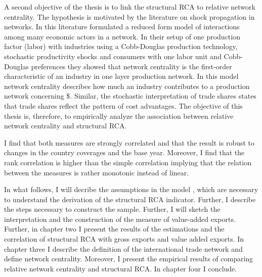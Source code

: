  A second objective of the thesis is to link the structural RCA to relative network centrality. The hypothesis is motivated by the literature on shock propagation in networks. In this literature \textcite{acemoglu2012} formulated a reduced form model of interactions among many economic actors in a network.  In their setup of one production factor (labor) with industries using a Cobb-Douglas production technology, stochastic productivity shocks and consumers with one labor unit and  Cobb-Douglas preferences they showed that network centrality is the first-order characteristic of an industry in one layer production network. In this model network centrality describes how much an industry contributes to a production network concerning \$. Similar, the stochastic interpretation of trade shares states that trade shares reflect the pattern of cost advantages. The objective of this thesis is, therefore, to empirically analyze the association between relative network centrality and structural RCA. \par
I find that both measures are strongly correlated and that the result is robust to changes in the country coverages and the base year. Moreover, I find that the rank correlation is higher than the simple correlation implying that the relation between the measures is rather monotonic instead of linear. 
 \par %
In what follows, I will decribe the assumptions  in the model \textcite{costinot}, which are necessary to understand the derivation of  the structural  RCA indicator. Further, I describe the steps necessary to construct the sample. Further, I will sketch the interpretation and the construction of the measure of value-added exports.  Further, in chapter two I present the results of the estimations and the correlation of structural RCA with gross exports and value added exports. In chapter three I describe the definition of the international trade network and define network centrality. Moreover, I present the empirical results of comparing relative network centrality and structural RCA. In chapter four I conclude. 
\endinput 
